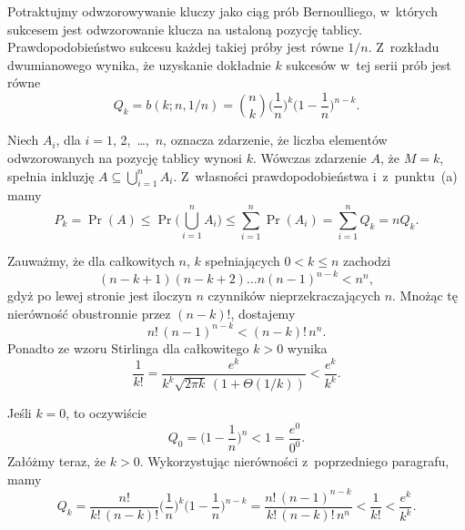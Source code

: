 
\subproblem %
Potraktujmy odwzorowywanie kluczy jako ciąg prób Bernoulliego, w~których sukcesem jest odwzorowanie klucza na ustaloną pozycję tablicy. Prawdopodobieństwo sukcesu każdej takiej próby jest równe $1/n$. Z~rozkładu dwumianowego wynika, że uzyskanie dokładnie $k$ sukcesów w~tej serii prób jest równe
\[
	Q_k = b(k;n,1/n) = \binom{n}{k}\biggl(\frac{1}{n}\biggr)^k\biggl(1-\frac{1}{n}\biggr)^{n-k}.
\]

\subproblem %
Niech $A_i$, dla $i=1$, 2,~\dots,~$n$, oznacza zdarzenie, że liczba elementów odwzorowanych na  pozycję tablicy wynosi $k$. Wówczas zdarzenie $A$, że $M=k$, spełnia inkluzję $A\subseteq\bigcup_{i=1}^nA_i$. Z~własności prawdopodobieństwa i~z~punktu~(a) mamy
\[
	P_k = \Pr(A) \le \Pr\biggl(\bigcup_{i=1}^nA_i\biggr) \le \sum_{i=1}^n\Pr(A_i) = \sum_{i=1}^nQ_k = nQ_k.
\]

\subproblem %
Zauważmy, że dla całkowitych $n$, $k$ spełniających $0<k\le n$ zachodzi
\[
	(n-k+1)(n-k+2)\dots n(n-1)^{n-k} < n^n,
\]
gdyż po lewej stronie jest iloczyn $n$ czynników nieprzekraczających $n$. Mnożąc tę nierówność obustronnie przez $(n-k)!$, dostajemy
\[
	n!\,(n-1)^{n-k} < (n-k)!\,n^n.
\]
Ponadto ze wzoru Stirlinga dla całkowitego $k>0$ wynika
\[
	\frac{1}{k!} = \frac{e^k}{k^k\sqrt{2\pi k}\,(1+\Theta(1/k))} < \frac{e^k}{k^k}.
\]

Jeśli $k=0$, to oczywiście
\[
	Q_0 = \biggl(1-\frac{1}{n}\biggr)^n < 1 = \frac{e^0}{0^0}.
\]
Załóżmy teraz, że $k>0$. Wykorzystując nierówności z~poprzedniego paragrafu, mamy
\[
	Q_k = \frac{n!}{k!\,(n-k)!}\biggl(\frac{1}{n}\biggr)^k\biggl(1-\frac{1}{n}\biggr)^{n-k} = \frac{n!\,(n-1)^{n-k}}{k!\,(n-k)!\,n^n} < \frac{1}{k!} < \frac{e^k}{k^k}.
\]

\subproblem %



